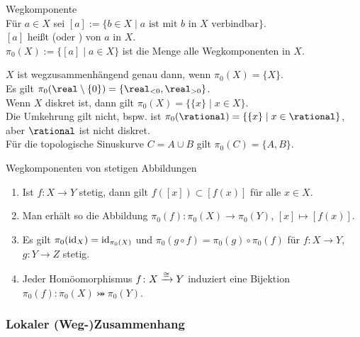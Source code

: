 \begin{Def}{Wegkomponente}\\
    Für $a \in X$ sei
    $[a] := \{b \in X \;|\; a \text{ ist mit } b \text{ in }
    X \text{ verbindbar}\}$. \\
    $[a]$ heißt 
    (oder ) von $a$ in $X$. \\
    $\pi_0(X) := \{[a] \;|\; a \in X\}$ ist die Menge alle Wegkomponenten
    in $X$.
\end{Def}

\begin{Bsp}
    $X$ ist wegzusammenhängend genau dann, wenn $\pi_0(X) = \{X\}$. \\
    Es gilt $\pi_0(\real \setminus \{0\}) = \{\real_{<0}, \real_{>0}\}$. \\
    Wenn $X$ diskret ist, dann gilt $\pi_0(X) = \{\{x\} \;|\; x \in X\}$. \\
    Die Umkehrung gilt nicht, bspw. ist
    $\pi_0(\rational) = \{\{x\} \;|\; x \in \rational\}$,
    aber $\rational$ ist nicht diskret. \\
    Für die topologische Sinuskurve $C = A \cup B$ gilt $\pi_0(C) = \{A, B\}$.
\end{Bsp}

\begin{Satz}{Wegkomponenten von stetigen Abbildungen}
    \begin{enumerate}
        \item
        Ist $f\colon X \rightarrow Y$ stetig, dann gilt
        $f([x]) \subset [f(x)]$ für alle $x \in X$.
        
        \item
        Man erhält so die Abbildung
        $\pi_0(f)\colon \pi_0(X) \rightarrow \pi_0(Y)$,
        $[x] \mapsto [f(x)]$.
        
        \item
        Es gilt $\pi_0(\operatorname{id}_X) = \operatorname{id}_{\pi_0(X)}$ und
        $\pi_0(g \circ f) = \pi_0(g) \circ \pi_0(f)$ für
        $f\colon X \rightarrow Y$, $g\colon Y \rightarrow Z$ stetig.
        
        \item
        Jeder Homöomorphismus $f\colon X \xrightarrow{\cong} Y$ induziert eine Bijektion
        $\pi_0(f)\colon \pi_0(X) \bij \pi_0(Y)$.
    \end{enumerate}
\end{Satz}

\subsubsection{%
    Lokaler (Weg-)Zusammenhang%
}

